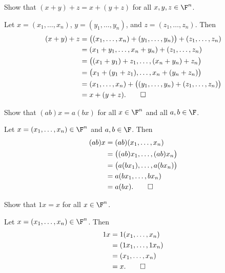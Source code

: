 \begin{exercise}
Show that $(x+y)+z=x+(y+z)$ for all $x,y,z\in\F^n$.
\end{exercise}
\begin{solution}
Let $x=(x_1,\dots,x_n)$, $y=(y_1,\dots,y_n)$, and $z=(z_1,\dots,z_n)$. Then
\begin{align*}
(x+y)+z &= \bigl((x_1,\dots,x_n)+(y_1,\dots,y_n)\bigr)+(z_1,\dots,z_n)\\
  &= (x_1+y_1,\dots,x_n+y_n)+(z_1,\dots,z_n)\\
  &= \bigl((x_1+y_1)+z_1,\dots,(x_n+y_n)+z_n\bigr)\\
  &= \bigl(x_1+(y_1+z_1),\dots,x_n+(y_n+z_n)\bigr)\\
  &= (x_1,\dots,x_n)+\bigl((y_1,\dots,y_n)+(z_1,\dots,z_n)\bigr)\\
  &= x+(y+z). \qedhere
\end{align*}
\end{solution}

\begin{exercise}
Show that $(ab)x=a(bx)$ for all $x\in\F^n$ and all $a,b\in\F$.
\end{exercise}
\begin{solution}
Let $x=(x_1,\dots,x_n)\in\F^n$ and $a,b\in\F$. Then
\begin{align*}
(ab)x &= (ab)(x_1,\dots,x_n)\\
      &= \bigl((ab)x_1,\dots,(ab)x_n\bigr)\\
      &= \bigl(a(bx_1),\dots,a(bx_n)\bigr)\\
      &= a(bx_1,\dots,bx_n)\\
      &= a(bx). \qedhere
\end{align*}
\end{solution}

\begin{exercise}
Show that $1x=x$ for all $x\in\F^n$.
\end{exercise}
\begin{solution}
Let $x=(x_1,\dots,x_n)\in\F^n$. Then
\begin{align*}
1x &= 1(x_1,\dots,x_n)\\
   &= (1x_1,\dots,1x_n)\\
   &= (x_1,\dots,x_n)\\
   &= x. \qedhere
\end{align*}
\end{solution}

